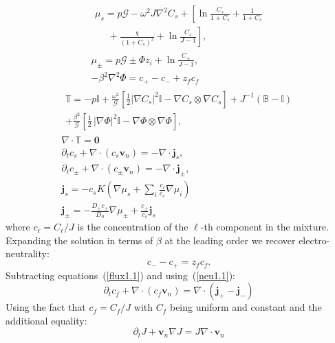 \documentclass[12pt]{extarticle}
\begin{document}
\begin{gather}
\begin{aligned}
\mu_s = p \mathcal{G} - \omega^2 J \nabla^2 C_s + \left[\ln \frac{C_s}{1+C_s} + \frac{1}{1+C_s}\right.\\
\left.\ \ \ \ \ \ +\frac{\chi}{(1+C_s)^2} + \ln \frac{C_s}{J-1} \right], 
\end{aligned}\\[2.5mm]
\mu_\pm = p \mathcal{G} \pm \Phi z_i + \ln \frac{C_\pm}{J-1} ,\\
-\beta^2 \nabla^2 \Phi = c_+-c_-+z_fc_f\, 
\end{gather}
\begin{gather}
\begin{aligned}
\mathbb{T}= -p \mathbb{I} +\frac{\omega^2 }{\mathcal{G}} \left[\frac{1}{2} |\nabla C_s|^2\mathbb{I} - \nabla C_s \otimes \nabla C_s\right]+ J^{-1}\left(\mathbb{B}-\mathbb{I}\right)\\
+ \frac{\beta^2}{\mathcal{G}} \left[\frac{1}{2} \,|\nabla \Phi|^2\mathbb{I} -\nabla \Phi \otimes \nabla \Phi\right],
\end{aligned}\\
\nabla \cdot \mathbb{T}=\mathbf{0}\\
\partial_t c_s + \nabla \cdot(c_s \mathbf{v}_n)=- \nabla \cdot\mathbf{j}_s,\\
\partial_t c_\pm + \nabla \cdot(c_\pm \mathbf{v}_n)= -\nabla\cdot\mathbf{j}_\pm,\label{flux1.1}\\
\mathbf{j}_s =-c_sK  \left(\nabla \mu_s +\sum_i \frac{c_i}{c_s} \nabla \mu_i\right)\\
\mathbf{j}_\pm= - \frac{D_\pm c_\pm}{D_0}\nabla \mu_\pm + \frac{c_\pm}{c_s}\mathbf{j}_s
\end{gather}
where $c_\ell=C_\ell/J$ is the concentration of the $\ell$-th component in the mixture.
Expanding the solution in terms of $\beta$ at the leading order we recover electro-neutrality:
\begin{equation}
c_- - c_+=z_f c_f. \label{neu1.1}
\end{equation}
Subtracting equations~(\ref{flux1.1}) and using~(\ref{neu1.1}):
\begin{equation}
\partial_t c_f +\nabla \cdot(c_f \mathbf{v}_n)= \nabla\cdot(\mathbf{j}_+-\mathbf{j}_-)
\end{equation}
Using the fact that $c_f=C_f/J$ with $C_f$ being uniform and constant and the additional equality:
\begin{equation}
\partial_t J + \mathbf{v}_n \nabla J=J\nabla \cdot\mathbf{v}_n
\end{equation}
\end{document}
